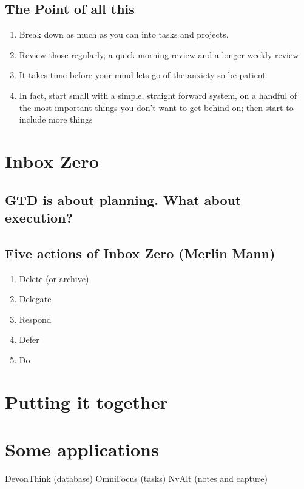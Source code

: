 \documentclass[11pt]{article}
\begin{document}
\subsection{The Point of all this}
\label{sec-5-2}
\begin{enumerate}
\item Break down as much as you can into tasks and projects.
\item Review those regularly, a quick morning review and a longer weekly review
\item It takes time before your mind lets go of the anxiety so be patient
\item In fact, start small with a simple, straight forward system, on a
handful of the most important things you don't want to get behind
on; then start to include more things
\end{enumerate}
\section{Inbox Zero}
\label{sec-6}
\subsection{GTD is about planning. What about execution?}
\label{sec-6-1}

\subsection{Five actions of Inbox Zero (Merlin Mann)}
\label{sec-6-2}
\begin{enumerate}
\item Delete (or archive)
\item Delegate
\item Respond
\item Defer
\item Do
\end{enumerate}
\section{Putting it together}
\label{sec-7}
\section{Some applications}
\label{sec-8}
DevonThink (database)
OmniFocus (tasks)
NvAlt (notes and capture)
\end{document}
